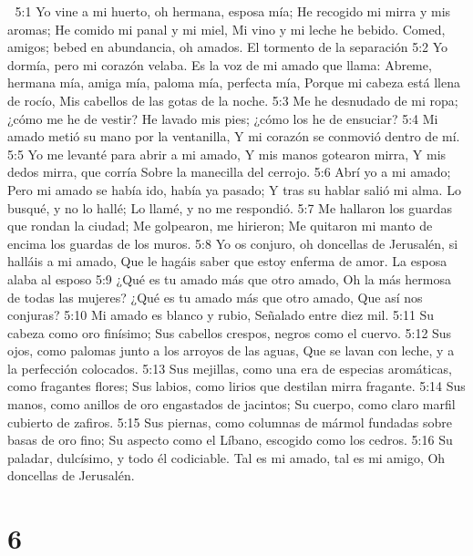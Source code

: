 
5:1 Yo vine a mi huerto, oh hermana, esposa mía;  
He recogido mi mirra y mis aromas;  
He comido mi panal y mi miel,  
Mi vino y mi leche he bebido.  
Comed, amigos; bebed en abundancia, oh amados.  
El tormento de la separación  
5:2 Yo dormía, pero mi corazón velaba.  
Es la voz de mi amado que llama:  
Abreme, hermana mía, amiga mía, paloma mía, perfecta mía,  
Porque mi cabeza está llena de rocío,  
Mis cabellos de las gotas de la noche.  
5:3 Me he desnudado de mi ropa; ¿cómo me he de vestir?  
He lavado mis pies; ¿cómo los he de ensuciar?  
5:4 Mi amado metió su mano por la ventanilla,  
Y mi corazón se conmovió dentro de mí.  
5:5 Yo me levanté para abrir a mi amado,  
Y mis manos gotearon mirra,  
Y mis dedos mirra, que corría  
Sobre la manecilla del cerrojo.  
5:6 Abrí yo a mi amado;  
Pero mi amado se había ido, había ya pasado;  
Y tras su hablar salió mi alma.  
Lo busqué, y no lo hallé;  
Lo llamé, y no me respondió.  
5:7 Me hallaron los guardas que rondan la ciudad;  
Me golpearon, me hirieron;  
Me quitaron mi manto de encima los guardas de los muros.  
5:8 Yo os conjuro, oh doncellas de Jerusalén, si halláis a mi amado,  
Que le hagáis saber que estoy enferma de amor.  
La esposa alaba al esposo  
5:9 ¿Qué es tu amado más que otro amado,  
Oh la más hermosa de todas las mujeres?  
¿Qué es tu amado más que otro amado,  
Que así nos conjuras?  
5:10 Mi amado es blanco y rubio,  
Señalado entre diez mil.  
5:11 Su cabeza como oro finísimo;  
Sus cabellos crespos, negros como el cuervo.  
5:12 Sus ojos, como palomas junto a los arroyos de las aguas,  
Que se lavan con leche, y a la perfección colocados.  
5:13 Sus mejillas, como una era de especias aromáticas, como fragantes flores;  
Sus labios, como lirios que destilan mirra fragante.  
5:14 Sus manos, como anillos de oro engastados de jacintos;  
Su cuerpo, como claro marfil cubierto de zafiros.  
5:15 Sus piernas, como columnas de mármol fundadas sobre basas de oro fino;  
Su aspecto como el Líbano, escogido como los cedros.  
5:16 Su paladar, dulcísimo, y todo él codiciable.  
Tal es mi amado, tal es mi amigo,  
Oh doncellas de Jerusalén.  

\chapter{6}

